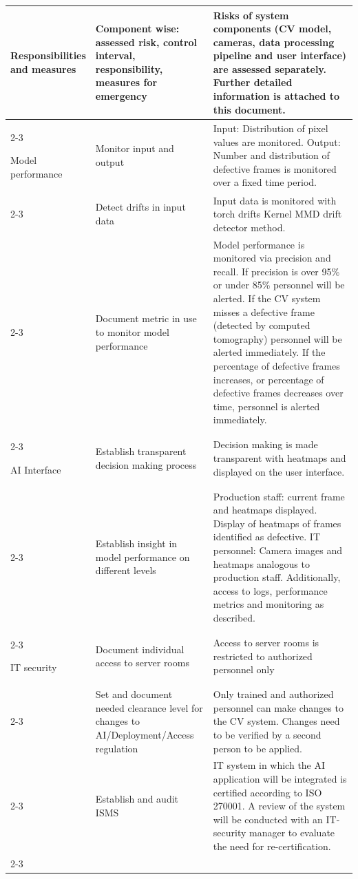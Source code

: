 {\begin{longtable}{p{0.15\linewidth}|p{0.35\linewidth}p{0.5\linewidth}}
    \hline
    Responsibilities and measures   
        & Component wise: assessed risk, control interval, responsibility, measures for emergency & Risks of system components (CV model, cameras, data processing pipeline and user interface) are assessed separately. Further detailed information is attached to this document.\\\cline{2-3}
    
    \hline
    \pagebreak
    \hline
    Model performance               
        & Monitor input and output & Input: Distribution of pixel values are monitored. Output: Number and distribution of defective frames is monitored over a fixed time period.\\\cline{2-3}
        & Detect drifts in input data & Input data is monitored with torch drifts Kernel MMD drift detector method.\\\cline{2-3}
        & Document metric in use to monitor model performance & Model performance is monitored via precision and recall. If precision is over 95\% or under 85\% personnel will be alerted. If the CV system  misses a defective frame (detected by computed tomography) personnel will be alerted immediately. If the percentage of defective frames increases, or percentage of defective frames decreases over time, personnel is alerted immediately.\\\cline{2-3}
    
    \hline
    AI Interface                    
        & Establish transparent decision making process & Decision making is made transparent with heatmaps and displayed on the user interface. \\\cline{2-3}
        & Establish insight in model performance on different levels & Production staff: current frame and heatmaps displayed. Display of heatmaps of frames identified as defective.
        IT personnel: Camera images and heatmaps analogous to production staff. Additionally, access to logs, performance metrics and monitoring as described.\\\cline{2-3}
    
    \hline
    IT security                     
        & Document individual access to server rooms & Access to server rooms is restricted to authorized personnel only\\\cline{2-3}
        & Set and document needed clearance level for changes to AI/Deployment/Access regulation & Only trained and authorized personnel can make changes to the CV system. Changes need to be verified by a second person to be applied.\\\cline{2-3}
        & Establish and audit ISMS & IT system in which the AI application will be integrated is certified according to ISO 270001. A review of the system will be conducted with an IT-security manager to evaluate the need for re-certification.\\ \cline{2-3}
    

\end{longtable}}
